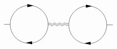 \[\begin{gathered}
\begin{tikzpicture}[x=0.75pt,y=0.75pt,yscale=-1,xscale=1]
            \draw   (199.71,176.48) .. controls (199.71,156.13) and (216.21,139.63) .. (236.56,139.63) .. controls (256.91,139.63) and (273.41,156.13) .. (273.41,176.48) .. controls (273.41,196.84) and (256.91,213.34) .. (236.56,213.34) .. controls (216.21,213.34) and (199.71,196.84) .. (199.71,176.48) -- cycle ;
            \draw    (245,140) ;
            \draw [shift={(245,140)}, rotate = 180] [fill={rgb, 255:red, 0; green, 0; blue, 0 }  ][line width=0.08]  [draw opacity=0] (12,-3) -- (0,0) -- (12,3) -- cycle    ;
            \draw    (237.56,212.34) -- (232.26,212.34) ;
            \draw [shift={(230.26,212.34)}, rotate = 360] [fill={rgb, 255:red, 0; green, 0; blue, 0 }  ][line width=0.08]  [draw opacity=0] (12,-3) -- (0,0) -- (12,3) -- cycle    ;
            \draw    (273.41,174.98) .. controls (275.08,173.31) and (276.74,173.31) .. (278.41,174.98) .. controls (280.08,176.65) and (281.74,176.65) .. (283.41,174.98) .. controls (285.08,173.31) and (286.74,173.31) .. (288.41,174.98) .. controls (290.08,176.65) and (291.74,176.65) .. (293.41,174.98) .. controls (295.08,173.31) and (296.74,173.31) .. (298.41,174.98) .. controls (300.08,176.65) and (301.74,176.65) .. (303.41,174.98) .. controls (305.08,173.31) and (306.74,173.31) .. (308.41,174.98) -- (313.12,174.98) -- (313.12,174.98)(273.41,177.98) .. controls (275.08,176.31) and (276.74,176.31) .. (278.41,177.98) .. controls (280.08,179.65) and (281.74,179.65) .. (283.41,177.98) .. controls (285.08,176.31) and (286.74,176.31) .. (288.41,177.98) .. controls (290.08,179.65) and (291.74,179.65) .. (293.41,177.98) .. controls (295.08,176.31) and (296.74,176.31) .. (298.41,177.98) .. controls (300.08,179.65) and (301.74,179.65) .. (303.41,177.98) .. controls (305.08,176.31) and (306.74,176.31) .. (308.41,177.98) -- (313.12,177.98) -- (313.12,177.98) ;
            \draw   (313.71,177.48) .. controls (313.71,157.13) and (330.21,140.63) .. (350.56,140.63) .. controls (370.91,140.63) and (387.41,157.13) .. (387.41,177.48) .. controls (387.41,197.84) and (370.91,214.34) .. (350.56,214.34) .. controls (330.21,214.34) and (313.71,197.84) .. (313.71,177.48) -- cycle ;
            \draw    (359,141) ;
            \draw [shift={(359,141)}, rotate = 180] [fill={rgb, 255:red, 0; green, 0; blue, 0 }  ][line width=0.08]  [draw opacity=0] (12,-3) -- (0,0) -- (12,3) -- cycle    ;
            \draw    (351.56,213.34) -- (346.26,213.34) ;
            \draw [shift={(344.26,213.34)}, rotate = 360] [fill={rgb, 255:red, 0; green, 0; blue, 0 }  ][line width=0.08]  [draw opacity=0] (12,-3) -- (0,0) -- (12,3) -- cycle    ;
            \draw    (187.71,176.48) -- (199.71,176.48) ;
            \draw    (387.41,177.48) -- (399.41,177.48) ;
            

\end{tikzpicture}
\end{gathered}\]
